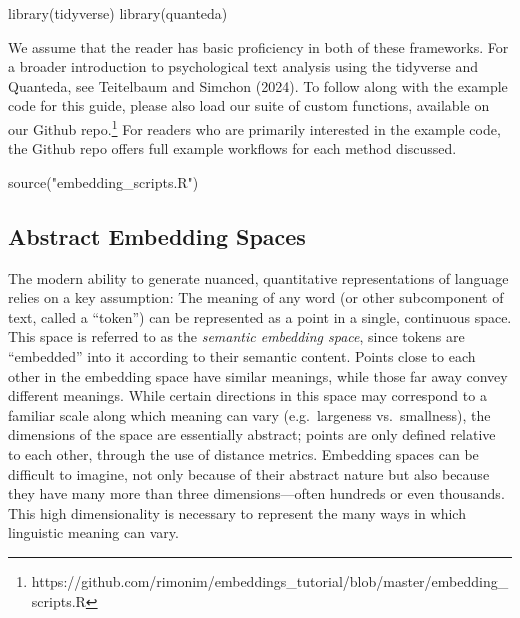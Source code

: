 \documentclass[
  man,
  floatsintext,
  longtable,
  nolmodern,
  notxfonts,
  notimes,
  colorlinks=true,linkcolor=blue,citecolor=blue,urlcolor=blue]{apa7}
\newenvironment{Shaded}{\begin{snugshade}}{\end{snugshade}}
\newcommand{\FunctionTok}[1]{\textcolor[rgb]{0.28,0.35,0.67}{#1}}
\newcommand{\NormalTok}[1]{\textcolor[rgb]{0.00,0.23,0.31}{#1}}
\newcommand{\StringTok}[1]{\textcolor[rgb]{0.13,0.47,0.30}{#1}}
\begin{document}
\begin{Shaded}
\begin{Highlighting}[]
\FunctionTok{library}\NormalTok{(tidyverse)}
\FunctionTok{library}\NormalTok{(quanteda)}
\end{Highlighting}
\end{Shaded}

We assume that the reader has basic proficiency in both of these
frameworks. For a broader introduction to psychological text analysis
using the tidyverse and Quanteda, see Teitelbaum and Simchon (2024). To
follow along with the example code for this guide, please also load our
suite of custom functions, available on our Github repo.\footnote{https://github.com/rimonim/embeddings\_tutorial/blob/master/embedding\_scripts.R}
For readers who are primarily interested in the example code, the Github
repo offers full example workflows for each method discussed.

\begin{Shaded}
\begin{Highlighting}[]
\FunctionTok{source}\NormalTok{(}\StringTok{"embedding\_scripts.R"}\NormalTok{)}
\end{Highlighting}
\end{Shaded}

\subsection{Abstract Embedding Spaces}\label{abstract-embedding-spaces}

The modern ability to generate nuanced, quantitative representations of
language relies on a key assumption: The meaning of any word (or other
subcomponent of text, called a ``token'') can be represented as a point
in a single, continuous space. This space is referred to as the
\emph{semantic embedding space}, since tokens are ``embedded'' into it
according to their semantic content. Points close to each other in the
embedding space have similar meanings, while those far away convey
different meanings. While certain directions in this space may
correspond to a familiar scale along which meaning can vary
(e.g.~largeness vs.~smallness), the dimensions of the space are
essentially abstract; points are only defined relative to each other,
through the use of distance metrics. Embedding spaces can be difficult
to imagine, not only because of their abstract nature but also because
they have many more than three dimensions---often hundreds or even
thousands. This high dimensionality is necessary to represent the many
ways in which linguistic meaning can vary.
\end{document}
